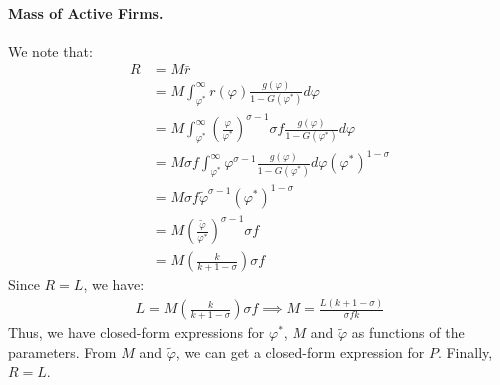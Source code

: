 \begin{solution}
\paragraph{Mass of Active Firms.} We note that:
\begin{align*}
R &= M \bar{r} \\
&= M \int_{\varphi^*}^{\infty} r(\varphi) \frac{g(\varphi)}{1 - G(\varphi^*)} d\varphi \\
&= M \int_{\varphi^*}^{\infty} \left(\frac{\varphi}{\varphi^*}\right)^{\sigma - 1} \sigma f \frac{g(\varphi)}{1 - G(\varphi^*)} d\varphi \\
&= M \sigma f \int_{\varphi^*}^{\infty} \varphi^{\sigma - 1} \frac{g(\varphi)}{1 - G(\varphi^*)} d\varphi \left(\varphi^*\right)^{1 - \sigma} \\
&= M \sigma f \tilde{\varphi}^{\sigma - 1} \left(\varphi^*\right)^{1 - \sigma} \\
&= M \left(\frac{\tilde{\varphi}}{\varphi^*}\right)^{\sigma - 1} \sigma f \\
&= M \left( \frac{k}{k + 1 - \sigma} \right) \sigma f
\end{align*}
Since $R = L$, we have:
\begin{align*}
L = M \left( \frac{k}{k + 1 - \sigma} \right) \sigma f \implies M = \frac{L (k + 1 - \sigma)}{\sigma f k}
\end{align*}
Thus, we have closed-form expressions for $\varphi^*$, $M$ and $\tilde{\varphi}$ as functions of the parameters. From $M$ and $\tilde{\varphi}$, we can get a closed-form expression for $P$. Finally, $R = L$.
\end{solution}

